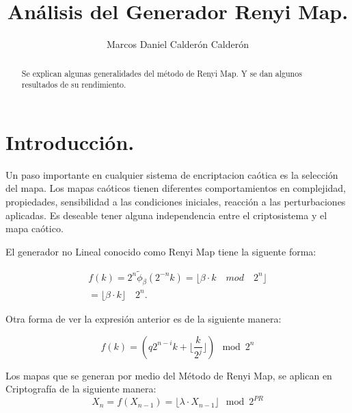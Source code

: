 \documentclass[12pt,3p]{elsarticle}
\begin{document}
\begin{frontmatter}

\title{Análisis del Generador Renyi Map.}



\author{Marcos Daniel Calderón Calderón}







\begin{abstract}
Se explican algunas generalidades del método de Renyi Map. Y se dan algunos resultados de su rendimiento.
\end{abstract}



\end{frontmatter}

\section{Introducción.}
Un paso importante en cualquier sistema de encriptacion caótica es la selección del mapa. Los mapas caóticos tienen diferentes comportamientos en complejidad, propiedades, sensibilidad a las condiciones iniciales, reacción a las perturbaciones aplicadas. Es deseable tener alguna independencia entre el criptosistema y el mapa caótico. 

El generador no Lineal conocido como Renyi Map tiene la siguente forma:

\begin{equation}
\begin{aligned}
f(k)= 2^{n}\tilde{\phi}_{\beta}(2^{-n}k)=\lfloor \beta \cdot k \quad mod \quad 2^{n}  \rfloor \\
=\lfloor  \beta \cdot k  \rfloor \quad 2^{n}.
\end{aligned}
\end{equation}


Otra forma de ver la expresión anterior es de la siguiente manera:

\begin{equation}
f(k)= \left(  q2^{n-i}k + \lfloor \frac{k}{2^{j}} \rfloor \right)  \mod{2^{n}}  
\end{equation}

Los mapas que se generan por medio del Método de Renyi Map, se aplican en Criptografía de la siguiente manera:
\begin{equation}
X_{n}= f(X_{n-1})= \lfloor \lambda \cdot X_{n-1}  \rfloor \mod{2^{PR}} 
\end{equation}
\end{document}
